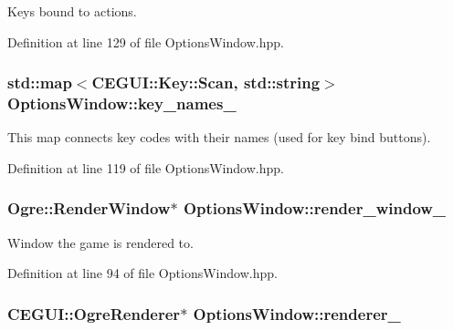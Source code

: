 Keys bound to actions. 



Definition at line 129 of file Options\+Window.\+hpp.

\subsubsection[{\texorpdfstring{key\+\_\+names\+\_\+}{key_names_}}]{\setlength{\rightskip}{0pt plus 5cm}std\+::map$<$C\+E\+G\+U\+I\+::\+Key\+::\+Scan, std\+::string$>$ Options\+Window\+::key\+\_\+names\+\_\+\hspace{0.3cm}{\ttfamily [private]}}\hypertarget{class_options_window_a65c8541c815655feaa458edb01738213}{}\label{class_options_window_a65c8541c815655feaa458edb01738213}


This map connects key codes with their names (used for key bind buttons). 



Definition at line 119 of file Options\+Window.\+hpp.

\subsubsection[{\texorpdfstring{render\+\_\+window\+\_\+}{render_window_}}]{\setlength{\rightskip}{0pt plus 5cm}Ogre\+::\+Render\+Window$\ast$ Options\+Window\+::render\+\_\+window\+\_\+\hspace{0.3cm}{\ttfamily [private]}}\hypertarget{class_options_window_a9c6b55b36d1f57ea60885cf0a59291ca}{}\label{class_options_window_a9c6b55b36d1f57ea60885cf0a59291ca}


Window the game is rendered to. 



Definition at line 94 of file Options\+Window.\+hpp.

\subsubsection[{\texorpdfstring{renderer\+\_\+}{renderer_}}]{\setlength{\rightskip}{0pt plus 5cm}C\+E\+G\+U\+I\+::\+Ogre\+Renderer$\ast$ Options\+Window\+::renderer\+\_\+\hspace{0.3cm}{\ttfamily [private]}}\hypertarget{class_options_window_aa46c54f3e0956dce55fb370324d91772}{}\label{class_options_window_aa46c54f3e0956dce55fb370324d91772}


